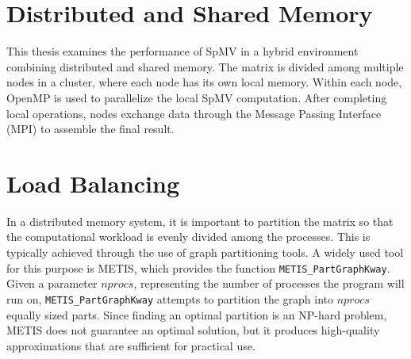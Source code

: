 



\section{Distributed and Shared Memory}
This thesis examines the performance of SpMV in a hybrid environment combining distributed and shared memory. The matrix is divided among multiple nodes in a cluster, where each node has its own local memory. Within each node, OpenMP is used to parallelize the local SpMV computation. After completing local operations, nodes exchange data through the Message Passing Interface (MPI) to assemble the final result. 

\section{Load Balancing}
In a distributed memory system, it is important to partition the matrix so that the computational workload is evenly divided among the processes. This is typically achieved through the use of graph partitioning tools. A widely used tool for this purpose is METIS, which provides the function \texttt{METIS\_PartGraphKway}. Given a parameter \(nprocs\), representing the number of processes the program will run on, \texttt{METIS\_PartGraphKway} attempts to partition the graph into \(nprocs\) equally sized parts. Since finding an optimal partition is an NP-hard problem, METIS does not guarantee an optimal solution, but it produces high-quality approximations that are sufficient for practical use.

